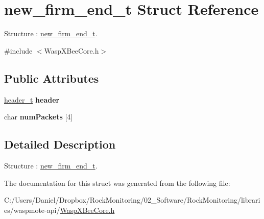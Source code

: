 \hypertarget{structnew__firm__end__t}{}\section{new\+\_\+firm\+\_\+end\+\_\+t Struct Reference}
\label{structnew__firm__end__t}


Structure \+: \hyperlink{structnew__firm__end__t}{new\+\_\+firm\+\_\+end\+\_\+t}.  




{\ttfamily \#include $<$Wasp\+X\+Bee\+Core.\+h$>$}

\subsection*{Public Attributes}
\begin{DoxyCompactItemize}
\item 
\hyperlink{structheader__t}{header\+\_\+t} {\bfseries header}\hypertarget{structnew__firm__end__t_a1d4a6e16d561cf8e8306d9d70b17f859}{}\label{structnew__firm__end__t_a1d4a6e16d561cf8e8306d9d70b17f859}

\item 
char {\bfseries num\+Packets} \mbox{[}4\mbox{]}\hypertarget{structnew__firm__end__t_acbc4c6882039480d7b4286fcda8e0cd4}{}\label{structnew__firm__end__t_acbc4c6882039480d7b4286fcda8e0cd4}

\end{DoxyCompactItemize}


\subsection{Detailed Description}
Structure \+: \hyperlink{structnew__firm__end__t}{new\+\_\+firm\+\_\+end\+\_\+t}. 

The documentation for this struct was generated from the following file\+:\begin{DoxyCompactItemize}
\item 
C\+:/\+Users/\+Daniel/\+Dropbox/\+Rock\+Monitoring/02\+\_\+\+Software/\+Rock\+Monitoring/libraries/waspmote-\/api/\hyperlink{_wasp_x_bee_core_8h}{Wasp\+X\+Bee\+Core.\+h}\end{DoxyCompactItemize}
